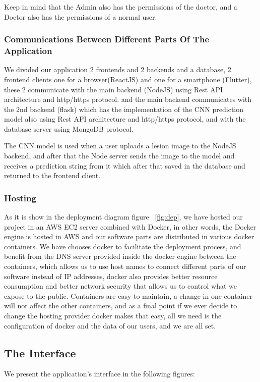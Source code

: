         Keep in mind that the Admin also has the permissions of the doctor, and a Doctor also has the permissions of a normal user.

    \subsubsection{Communications Between Different Parts Of The Application}
        We divided our application 2 frontends and 2 backends and a database, 2 frontend clients one for a browser(ReactJS) and one for a smartphone (Flutter), these 2 communicate with the main backend (NodeJS) using Rest API architecture and http/https protocol. and the main backend communicates with the 2nd backend (flask) which has the implementation of the CNN prediction model also using Rest API architecture and http/https protocol, and with the database server using MongoDB protocol.

        The CNN model is used when a user uploads a lesion image to the NodeJS backend, and after that the Node server sends the image to the model and receives a prediction string from it which after that saved in the database and returned to the frontend client.

    \subsubsection{Hosting}
    As it is show in the deployment diagram figure ~\ref{fig:dep}, we have hosted our project in an AWS EC2 server combined with Docker, in other words, the Docker engine is hosted in AWS and our software parts are distributed  in various docker containers.
    We have chooses docker to facilitate the deployment process, and benefit from the DNS server provided inside the docker engine between the containers, which allows us to use host names to connect different parts of our software instead of IP addresses, docker also provides better resource consumption and better network security that allows us to control what we expose to the public. Containers are easy to maintain, a change in one container will not affect the other containers, and as a final point if we ever decide to change the hosting provider docker makes that easy, all we need is the configuration of docker and the data of our users, and we are all set.

    \subsection{The Interface}
        We present the application's interface in the following figures: 



